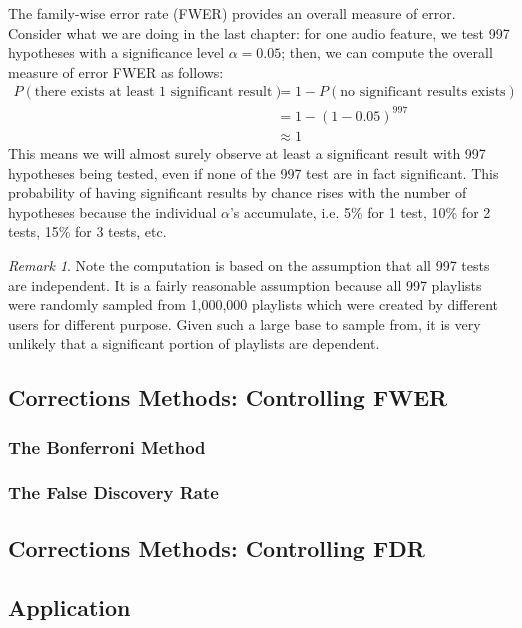 \documentclass[12pt]{article}
\theoremstyle{plain}
\theoremstyle{definition}
\theoremstyle{remark}
\newtheorem*{remark}{Remark}
\begin{document}
The family-wise error rate (FWER) provides an overall measure of error.\cite{5.1} Consider what we are doing in the last chapter: for one audio feature, we test 997 hypotheses with a significance level $\alpha=0.05$; then, we can compute the overall measure of error FWER\cite{5.4} as follows:
\begin{align*}
    P(\text{there exists at least 1 significant result})&=1-P(\text{no significant results exists})\\
    &=1-(1-0.05)^{997}\\
    &\approx 1
\end{align*}
This means we will almost surely observe at least a significant result with 997 hypotheses being tested, even if none of the 997 test are in fact significant. This probability of having significant results by chance rises with the number of hypotheses because the individual $\alpha$'s accumulate, i.e. 5\% for 1 test, 10\% for 2 tests, 15\% for 3 tests, etc.



\begin{remark}
Note the computation is based on the assumption that all 997 tests are independent. It is a fairly reasonable assumption because all 997 playlists were randomly sampled from 1,000,000 playlists which were created by different users for different purpose. Given such a large base to sample from, it is very unlikely that a significant portion of playlists are dependent.
\end{remark}

\newpage
\subsection{Corrections Methods: Controlling FWER}
\subsubsection{The Bonferroni Method}
\subsubsection{The False Discovery Rate}

\subsection{Corrections Methods: Controlling FDR}

\subsection{Application}
\end{document}
